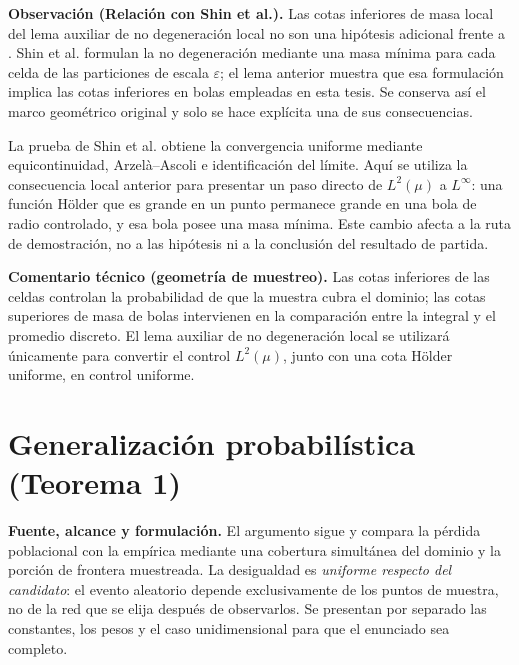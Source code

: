 \medskip
\noindent\textbf{Observación (Relación con Shin et al.).}
Las cotas inferiores de masa local del lema auxiliar de no degeneración local no son una hipótesis adicional
frente a \cite[Assumption~3.1]{shin2020convergence}. Shin et al. formulan la no degeneración
mediante una masa mínima para cada celda de las particiones de escala $\varepsilon$; el lema
anterior muestra que esa formulación implica las cotas inferiores en bolas empleadas en esta
tesis. Se conserva así el marco geométrico original y solo se hace explícita una de sus
consecuencias.

La prueba de Shin et al. obtiene la convergencia uniforme mediante equicontinuidad,
Arzelà--Ascoli e identificación del límite. Aquí se utiliza la consecuencia local anterior para
presentar un paso directo de $L^2(\mu)$ a $L^\infty$: una función Hölder que es grande en un
punto permanece grande en una bola de radio controlado, y esa bola posee una masa mínima.
Este cambio afecta a la ruta de demostración, no a las hipótesis ni a la conclusión del
resultado de partida.
\medskip

\medskip
\noindent\textbf{Comentario técnico (geometría de muestreo).}
Las cotas inferiores de las celdas controlan la probabilidad de que la muestra cubra el dominio;
las cotas superiores de masa de bolas intervienen en la comparación entre la integral y el
promedio discreto. El lema auxiliar de no degeneración local se utilizará únicamente para convertir el control
$L^2(\mu)$, junto con una cota Hölder uniforme, en control uniforme.

\section{Generalización probabilística (Teorema 1)}
\label{thm:generalizacion_shin}

\noindent\textbf{Fuente, alcance y formulación.}
El argumento sigue \cite[Theorem~3.1 y Appendix~B]{shin2020convergence} y compara la pérdida
poblacional con la empírica mediante una cobertura simultánea del dominio y
la porción de frontera muestreada. La desigualdad es \emph{uniforme respecto del
candidato}: el evento aleatorio depende exclusivamente de los puntos de muestra,
no de la red que se elija después de observarlos. Se presentan por separado las
constantes, los pesos y el caso unidimensional para que el enunciado sea completo.

